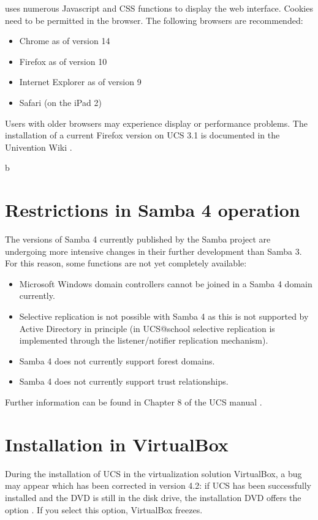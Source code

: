 \ucsUMC{} uses numerous Javascript and CSS functions to display the
web interface. Cookies need to be permitted in the browser.
The following browsers are recommended:

\begin{itemize}
\item Chrome as of version 14
\item Firefox as of version 10
\item Internet Explorer as of version 9
\item Safari (on the iPad 2)
\end{itemize}

Users with older browsers may experience display or performance
problems. The installation of a current Firefox version on UCS 3.1 is
documented in the Univention Wiki \cite{ucd-firefox7}.

b\section{Restrictions in Samba 4 operation}

The versions of Samba 4 currently published by the Samba project are
undergoing more intensive changes in their further
development than Samba 3. For this reason, some functions are not yet
completely available:

\begin{itemize}
\item Microsoft Windows domain controllers cannot be joined in a Samba
4 domain currently.
\item Selective replication is not possible with Samba 4 as this is
not supported by Active Directory in principle (in UCS@school
selective replication is implemented through the listener/notifier
replication mechanism).

\item Samba 4 does not currently support forest domains. 
\item Samba 4 does not currently support trust relationships.
\end{itemize}

Further information can be found in Chapter 8 of the UCS
manual \cite{UCS-Handbuch}.

\section{Installation in VirtualBox}
During the installation of UCS in the virtualization solution VirtualBox, a bug
may appear which has been corrected in version 4.2: if UCS has been
successfully installed and the DVD is still in the disk drive, the
installation DVD offers the option . If you select this option, VirtualBox freezes. 

